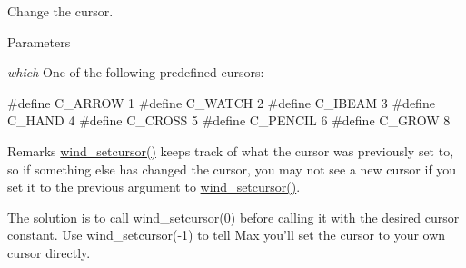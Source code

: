Change the cursor. 
\begin{DoxyParams}{Parameters}
\item[{\em which}]One of the following predefined cursors: 
\begin{DoxyCode}
    #define C_ARROW     1
    #define C_WATCH     2
    #define C_IBEAM     3
    #define C_HAND      4
    #define C_CROSS     5
    #define C_PENCIL    6
    #define C_GROW      8
\end{DoxyCode}
\end{DoxyParams}
\begin{DoxyRemark}{Remarks}
\hyperlink{group__misc_ga85a1754ef77207af4ab7617e7487336e}{wind\_\-setcursor()} keeps track of what the cursor was previously set to, so if something else has changed the cursor, you may not see a new cursor if you set it to the previous argument to \hyperlink{group__misc_ga85a1754ef77207af4ab7617e7487336e}{wind\_\-setcursor()}.
\end{DoxyRemark}
The solution is to call wind\_\-setcursor(0) before calling it with the desired cursor constant. Use wind\_\-setcursor(-\/1) to tell Max you’ll set the cursor to your own cursor directly. 